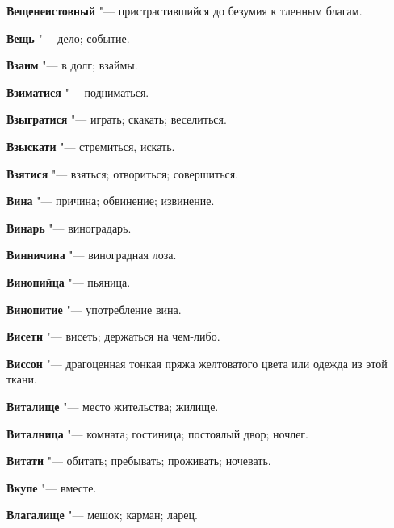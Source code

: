 \begin{mymulticols}{2}
\noindent\textbf{Вещенеистовный} "--- пристрастившийся до безумия к тленным благам. 




\noindent\textbf{Вещь} "--- дело; событие. 




\noindent\textbf{Взаим} "--- в долг; взаймы. 




\noindent\textbf{Взиматися} "--- подниматься. 




\noindent\textbf{Взыгратися} "--- играть; скакать; веселиться. 




\noindent\textbf{Взыскати} "--- стремиться, искать. 




\noindent\textbf{Взятися} "--- взяться; отвориться; совершиться. 




\noindent\textbf{Вина} "--- причина; обвинение; извинение. 




\noindent\textbf{Винарь} "--- виноградарь. 




\noindent\textbf{Винничина} "--- виноградная лоза. 




\noindent\textbf{Винопийца} "--- пьяница. 




\noindent\textbf{Винопитие} "--- употребление вина. 




\noindent\textbf{Висети} "--- висеть; держаться на чем-либо. 




\noindent\textbf{Виссон} "--- драгоценная тонкая пряжа желтоватого цвета или одежда из этой ткани. 




\noindent\textbf{Виталище} "--- место жительства; жилище. 




\noindent\textbf{Виталница} "--- комната; гостиница; постоялый двор; ночлег. 




\noindent\textbf{Витати} "--- обитать; пребывать; проживать; ночевать. 




\noindent\textbf{Вкупе} "--- вместе. 




\noindent\textbf{Влагалище} "--- мешок; карман; ларец. 





\end{mymulticols}
